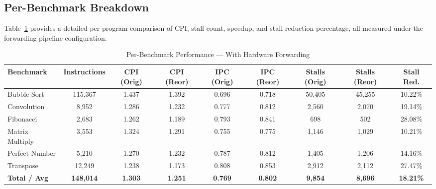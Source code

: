 \documentclass[11pt]{report}
\begin{document}
\subsection{Per-Benchmark Breakdown}

Table~\ref{tab:per_benchmark} provides a detailed per-program comparison of CPI, stall count, speedup, and stall reduction percentage, all measured under the forwarding pipeline configuration.

\begin{table}[H]
\centering
\caption{Per-Benchmark Performance --- With Hardware Forwarding}
\label{tab:per_benchmark}
\renewcommand{\arraystretch}{1.3}
\begin{adjustbox}{max width=\linewidth, center}
\footnotesize
\begin{tabular}{@{}lcccccccc@{}}
\toprule
\textbf{Benchmark} & \textbf{Instructions} & \textbf{CPI (Orig)} & \textbf{CPI (Reor)} & \textbf{IPC (Orig)} & \textbf{IPC (Reor)} & \textbf{Stalls (Orig)} & \textbf{Stalls (Reor)} & \textbf{Stall Red.} \\
\midrule
Bubble Sort     & 115,367 & 1.437 & 1.392 & 0.696 & 0.718 & 50,405 & 45,255 & 10.22\% \\
Convolution     & 8,952   & 1.286 & 1.232 & 0.777 & 0.812 & 2,560  & 2,070  & 19.14\% \\
Fibonacci       & 2,683   & 1.262 & 1.189 & 0.793 & 0.841 & 698    & 502    & 28.08\% \\
Matrix Multiply & 3,553   & 1.324 & 1.291 & 0.755 & 0.775 & 1,146  & 1,029  & 10.21\% \\
Perfect Number  & 5,210   & 1.270 & 1.232 & 0.787 & 0.812 & 1,405  & 1,206  & 14.16\% \\
Transpose       & 12,249  & 1.238 & 1.173 & 0.808 & 0.853 & 2,912  & 2,112  & 27.47\% \\
\midrule
\textbf{Total / Avg} & \textbf{148,014} & \textbf{1.303} & \textbf{1.251} & \textbf{0.769} & \textbf{0.802} & \textbf{9,854} & \textbf{8,696} & \textbf{18.21\%} \\
\bottomrule
\end{tabular}
\end{adjustbox}
\end{table}
\end{document}

